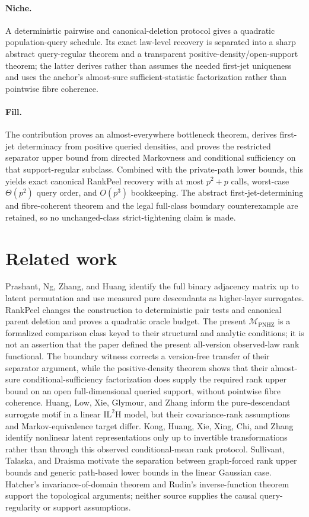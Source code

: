 \documentclass{article}
\begin{document}
\paragraph{Niche.} A deterministic pairwise and canonical-deletion protocol gives a quadratic population-query schedule.  Its exact law-level recovery is separated into a sharp abstract query-regular theorem and a transparent positive-density/open-support theorem; the latter derives rather than assumes the needed first-jet uniqueness and uses the anchor's almost-sure sufficient-statistic factorization rather than pointwise fibre coherence.

\paragraph{Fill.} The contribution proves an almost-everywhere bottleneck theorem, derives first-jet determinacy from positive queried densities, and proves the restricted separator upper bound from directed Markovness and conditional sufficiency on that support-regular subclass.  Combined with the private-path lower bounds, this yields exact canonical RankPeel recovery with at most \(p^2+p\) calls, worst-case \(\Theta(p^2)\) query order, and \(O(p^3)\) bookkeeping.  The abstract first-jet-determining and fibre-coherent theorem and the legal full-class boundary counterexample are retained, so no unchanged-class strict-tightening claim is made.

\section{Related work}

Prashant, Ng, Zhang, and Huang identify the full binary adjacency matrix up to latent permutation and use measured pure descendants as higher-layer surrogates.  RankPeel changes the construction to deterministic pair tests and canonical parent deletion and proves a quadratic oracle budget.  The present \(\mathcal M_{\mathrm{PNHZ}}\) is a formalized comparison class keyed to their structural and analytic conditions; it is not an assertion that the paper defined the present all-version observed-law rank functional.  The boundary witness corrects a version-free transfer of their separator argument, while the positive-density theorem shows that their almost-sure conditional-sufficiency factorization does supply the required rank upper bound on an open full-dimensional queried support, without pointwise fibre coherence.  Huang, Low, Xie, Glymour, and Zhang inform the pure-descendant surrogate motif in a linear \(\mathrm{IL}^{2}\mathrm H\) model, but their covariance-rank assumptions and Markov-equivalence target differ.  Kong, Huang, Xie, Xing, Chi, and Zhang identify nonlinear latent representations only up to invertible transformations rather than through this observed conditional-mean rank protocol.  Sullivant, Talaska, and Draisma motivate the separation between graph-forced rank upper bounds and generic path-based lower bounds in the linear Gaussian case.  Hatcher's invariance-of-domain theorem and Rudin's inverse-function theorem support the topological arguments; neither source supplies the causal query-regularity or support assumptions.
\end{document}
